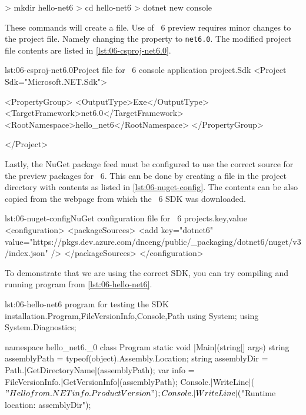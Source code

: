\begin{myVerbatim}
> mkdir hello-net6
> cd hello-net6
> dotnet new console
\end{myVerbatim}

These commands will create a  file. Use of \dotnet{}~6
preview requires minor changes to the project file. Namely changing the 
property to \verb|net6.0|. The modified project file contents are listed in \autoref{lst:06-csproj-net6.0}.

\begin{myListingXml}{lst:06-csproj-net6.0}{Project file for \dotnet{}~6 console application project.}{Sdk}
<Project Sdk="Microsoft.NET.Sdk">

  <PropertyGroup>
    <OutputType>Exe</OutputType>
    <TargetFramework>net6.0</TargetFramework>
    <RootNamespace>hello_net6</RootNamespace>
  </PropertyGroup>

</Project>
\end{myListingXml}

Lastly, the NuGet package feed must be configured to use the correct source for the preview packages
for \dotnet{}~6. This can be done by creating a  file in the project
directory with contents as listed in \autoref{lst:06-nuget-config}. The contents can be also copied
from the webpage from which the \dotnet{}~6 SDK was downloaded.

\begin{myListingXml}[basicstyle=\ttfamily\scriptsize]{lst:06-nuget-config}{NuGet configuration file for \dotnet{}~6 projects.}{key,value}
<configuration>
  <packageSources>
    <add key="dotnet6"
      value="https://pkgs.dev.azure.com/dnceng/public/_packaging/dotnet6/nuget/v3/index.json" />
  </packageSources>
</configuration>
\end{myListingXml}

To demonstrate that we are using the correct SDK, you can try compiling and running program from
\autoref{lst:06-hello-net6}.

\begin{myListingCsharp}{lst:06-hello-net6}{\csharp{} program for testing the SDK installation.}{Program,FileVersionInfo,Console,Path}{}
using System;
using System.Diagnostics;

namespace hello_net6._0
{
    class Program
    {
        static void |Main|(string[] args)
        {
            string assemblyPath = typeof(object).Assembly.Location;
            string assemblyDir = Path.|GetDirectoryName|(assemblyPath);
            var info = FileVersionInfo.|GetVersionInfo|(assemblyPath);
            Console.|WriteLine|($"Hello from .NET {info.ProductVersion}");
            Console.|WriteLine|($"Runtime location: {assemblyDir}");
        }
    }
}
\end{myListingCsharp}

